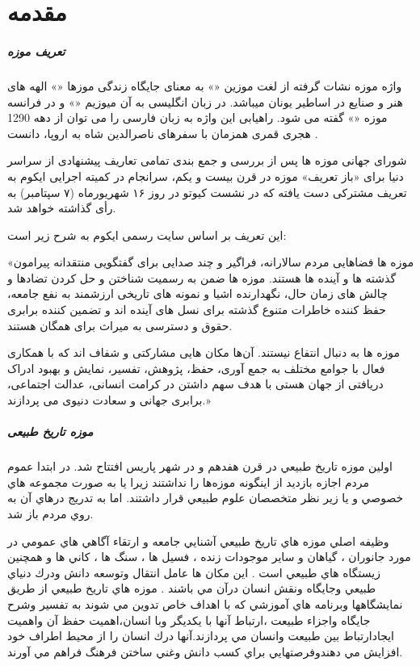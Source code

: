 
\chapter{مقدمه} \label{chapter:introduction}

\paragraph*{تعریف موزه}

واژه موزه نشات گرفته از لغت موزین «» به معنای جایگاه زندگی موزها «» الهه های هنر و صنایع در اساطیر یونان میباشد. در زبان انگلیسی به آن میوزیم «» و در فرانسه موزه «» گفته می شود. راهیابی این واژه به زبان فارسی را می توان از دهه 1290 هجری قمری همزمان با سفرهای ناصرالدین شاه به اروپا، دانست .

شورای جهانی موزه ها پس از بررسی و جمع بندی تمامی تعاریف پیشنهادی از سراسر دنیا برای «باز تعریف» موزه در قرن بیست و یکم، سرانجام در کمیته اجرایی ایکوم به تعریف مشترکی دست یافته که در نشست کیوتو در روز ۱۶ شهریورماه (۷ سپتامبر) به رأی گذاشته خواهد شد.

این تعریف بر اساس سایت رسمی ایکوم به شرح زیر است:

«موزه ها فضاهایی مردم سالارانه، فراگیر و چند صدایی برای گفتگویی منتقدانه پیرامون گذشته ها و آینده ها هستند. موزه ها ضمن به رسمیت شناختن و حل کردن تضادها و چالش های زمان حال، نگهدارنده اشیا و نمونه های تاریخی ارزشمند به نفع جامعه، حفظ کننده خاطرات متنوع گذشته برای نسل های آینده اند و تضمین کننده برابری حقوق و دسترسی به میراث برای همگان هستند.

موزه ها به دنبال انتفاع نیستند. آن‌ها مکان هایی مشارکتی و شفاف اند که با همکاری فعال با جوامع مختلف به جمع آوری، حفظ، پژوهش، تفسیر، نمایش و بهبود ادراک دریافتی از جهان هستی با هدف سهم داشتن در کرامت انسانی، عدالت اجتماعی، برابری جهانی و سعادت دنیوی می پردازند.»

\paragraph*{موزه تاریخ طبیعی}
اولين موزه تاريخ طبيعي در قرن هفدهم و در شهر پاريس افتتاح شد.
در ابتدا عموم مردم اجازه بازديد از اينگونه موزه‌ها را نداشتند زيرا يا به
صورت مجموعه هاي خصوصي و يا زير نظر متخصصان علوم طبيعي قرار داشتند. اما به تدريج درهاي آن به
روي مردم باز شد.

وظيفه اصلي موزه هاي تاريخ طبيعي آشنايي جامعه و ارتقاء آگاهي هاي عمومي در مورد جانوران ، گياهان و 
ساير موجودات زنده ، فسيل ها ، سنگ ها ، كاني ها و همچنين زيستگاه هاي طبيعي است . اين مكان ها 
عامل انتقال وتوسعه دانش ودرك دنياي طبيعي وجايگاه ونقش انسان درآن مي باشند . موزه هاي تاريخ طبيعي
از طريق نمايشگاهها وبرنامه هاي آموزشي كه با اهداف خاص تدوين مي شوند به تفسير وشرح جايگاه واجزاء
طبيعت ،ارتباط آنها با يكديگر وبا انسان،اهميت حفظ آن واهميت ايجادارتباط بين طبيعت وانسان مي
پردازند.آنها درك انسان را از محيط اطراف خود افزايش مي دهندوفرصتهايي براي كسب دانش وغني ساختن
فرهنگ فراهم مي آورند.

